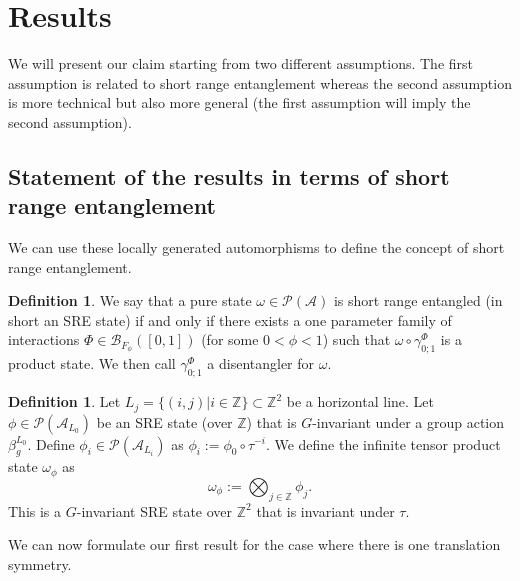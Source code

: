 \documentclass[12pt,a4paper,twoside]{article}
\newcommand{\BB}{\mathcal B}
\newcommand{\PP}{\mathcal P}
\newcommand{\ZZ}{\mathbb Z}
\renewcommand{\AA}{\mathcal A}
\theoremstyle{definition}
\newtheorem{definition}[theorem]{Definition}
\numberwithin{equation}{section}
\begin{document}
\section{Results}
We will present our claim starting from two different assumptions. The first assumption is related to short range entanglement whereas the second assumption is more technical but also more general (the first assumption will imply the second assumption).
\subsection{Statement of the results in terms of short range entanglement}\label{sec:Results_1}
We can use these locally generated automorphisms to define the concept of short range entanglement.
\begin{definition}\label{def:sre}
	We say that a pure state $\omega\in\PP(\AA)$ is short range entangled (in short an SRE state) if and only if there exists a one parameter family of interactions $\Phi\in\BB_{F_\phi}([0,1])$ (for some $0<\phi<1$) such that $\omega\circ\gamma^{\Phi}_{0;1}$ is a product state. We then call $\gamma^{\Phi}_{0;1}$ a disentangler for $\omega$.
\end{definition}
\begin{definition}\label{def:InfiniteTensorProduct}
Let $L_j=\{(i,j)|i\in\ZZ\}\subset\ZZ^2$ be a horizontal line. Let $\phi\in\PP(\AA_{L_0})$ be an SRE state (over $\ZZ$) that is $G$-invariant under a group action $\beta_g^{L_0}$. Define $\phi_i\in\PP(\AA_{L_i})$ as $\phi_i:=\phi_0\circ\tau^{-i}$. We define the infinite tensor product state $\omega_\phi$ as
\begin{equation}
\omega_\phi:=\bigotimes_{j\in\ZZ}\phi_j.
\end{equation}
This is a $G$-invariant SRE state over $\ZZ^2$ that is invariant under $\tau$.
\end{definition}
We can now formulate our first result for the case where there is one translation symmetry.
\end{document}
